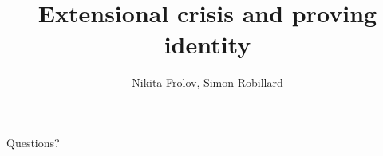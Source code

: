 \documentclass[14pt]{beamer}
\title{Extensional crisis and proving identity}
\author{Nikita Frolov, Simon Robillard}
\institute{}
\date{}
\begin{document}
\begin{frame}
  \maketitle
\end{frame}

\begin{frame}
  \begin{center}
    \Huge{Questions?}
  \end{center}
\end{frame}
\end{document}
